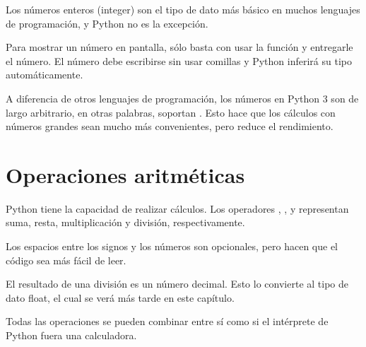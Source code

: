 Los números enteros (integer) son el tipo de dato más básico en muchos lenguajes de programación, y Python no es la excepción.


Para mostrar un número en pantalla, sólo basta con usar la función  y entregarle el número.
El número debe escribirse sin usar comillas y Python inferirá su tipo automáticamente.


A diferencia de otros lenguajes de programación, los números en Python 3 son de largo arbitrario, en otras palabras, soportan .
Esto hace que los cálculos con números grandes sean mucho más convenientes, pero reduce el rendimiento.


\section{Operaciones aritméticas}

Python tiene la capacidad de realizar cálculos.
Los operadores \ttt{+}, \ttt{-}, \ttt{*} y \ttt{/} representan suma, resta, multiplicación y división, respectivamente.


Los espacios entre los signos y los números son opcionales, pero hacen que el código sea más fácil de leer.

El resultado de una división es un número decimal.
Esto lo convierte al tipo de dato float, el cual se verá más tarde en este capítulo.


Todas las operaciones se pueden combinar entre sí como si el intérprete de Python fuera una calculadora.


